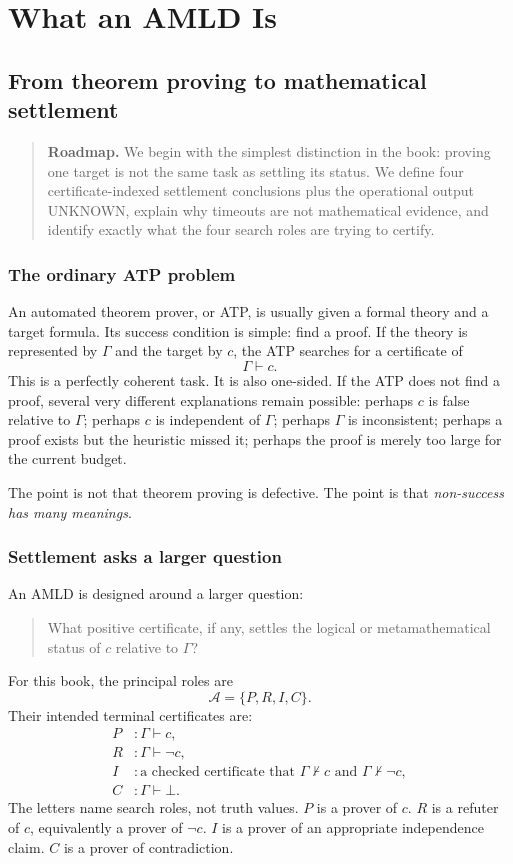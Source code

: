\documentclass[11pt,openany]{book}
\theoremstyle{definition}
\theoremstyle{remark}
\newenvironment{roadmap}{\begin{quote}\small\color{deepblue}\textbf{Roadmap.} }{\end{quote}}
\newcommand{\Agents}{\mathcal{A}}
\newcommand{\botc}{\bot}
\begin{document}
\tableofcontents
\mainmatter

\part{What an AMLD Is}

\chapter{From theorem proving to mathematical settlement}
\begin{roadmap}
We begin with the simplest distinction in the book: proving one target is not the same task as settling its status. We define four certificate-indexed settlement conclusions plus the operational output UNKNOWN, explain why timeouts are not mathematical evidence, and identify exactly what the four search roles are trying to certify.
\end{roadmap}

\section{The ordinary ATP problem}
An automated theorem prover, or ATP, is usually given a formal theory and a target formula. Its success condition is simple: find a proof. If the theory is represented by $\Gamma$ and the target by $c$, the ATP searches for a certificate of
\[
\Gamma\vdash c.
\]
This is a perfectly coherent task. It is also one-sided. If the ATP does not find a proof, several very different explanations remain possible: perhaps $c$ is false relative to $\Gamma$; perhaps $c$ is independent of $\Gamma$; perhaps $\Gamma$ is inconsistent; perhaps a proof exists but the heuristic missed it; perhaps the proof is merely too large for the current budget.

The point is not that theorem proving is defective. The point is that \emph{non-success has many meanings}.

\section{Settlement asks a larger question}
An AMLD is designed around a larger question:
\begin{quote}
What positive certificate, if any, settles the logical or metamathematical status of $c$ relative to $\Gamma$?
\end{quote}
For this book, the principal roles are
\[
\Agents=\{P,R,I,C\}.
\]
Their intended terminal certificates are:
\begin{align*}
P &: \Gamma\vdash c,\\
R &: \Gamma\vdash\neg c,\\
I &: \text{a checked certificate that }\Gamma\nvdash c\text{ and }\Gamma\nvdash\neg c,\\
C &: \Gamma\vdash\botc.
\end{align*}
The letters name search roles, not truth values. $P$ is a prover of $c$. $R$ is a refuter of $c$, equivalently a prover of $\neg c$. $I$ is a prover of an appropriate independence claim. $C$ is a prover of contradiction.
\end{document}
